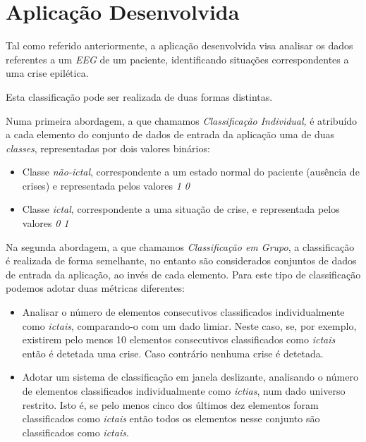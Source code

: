 \documentclass{article}
\begin{document}
\pagebreak

\section{Aplicação Desenvolvida}

Tal como referido anteriormente, a aplicação desenvolvida visa analisar os dados referentes a um \emph{EEG} de um paciente, identificando situações correspondentes a uma crise epilética.

Esta classificação pode ser realizada de duas formas distintas.

Numa primeira abordagem, a que chamamos \emph{Classificação Individual}, é atribuído a cada elemento do conjunto de dados de entrada da aplicação uma de duas \emph{classes}, representadas por dois valores binários:

\begin{itemize}
\item Classe \emph{não-ictal}, correspondente a um estado normal do paciente (ausência de crises) e representada pelos valores \emph{1 0}

\item Classe \emph{ictal}, correspondente a uma situação de crise, e representada pelos valores \emph{0 1}
\end{itemize}

Na segunda abordagem, a que chamamos \emph{Classificação em Grupo}, a classificação é realizada de forma semelhante, no entanto são considerados conjuntos de dados de entrada da aplicação, ao invés de cada elemento. Para este tipo de classificação podemos adotar duas métricas diferentes:

\begin{itemize}
\item Analisar o número de elementos consecutivos classificados individualmente como \emph{ictais}, comparando-o com um dado limiar. Neste caso, se, por exemplo, existirem pelo menos 10 elementos consecutivos classificados como \emph{ictais} então é detetada uma crise. Caso contrário nenhuma crise é detetada.

\item Adotar um sistema de classificação em janela deslizante, analisando o número de elementos classificados individualmente como \emph{ictias}, num dado universo restrito. Isto é, se pelo menos cinco dos últimos dez elementos foram classificados como \emph{ictais} então todos os elementos nesse conjunto são classificados como \emph{ictais}.
\end{itemize}
\end{document}

